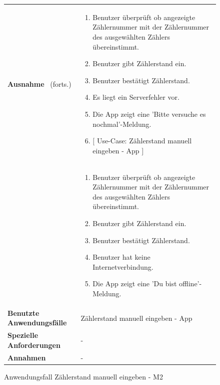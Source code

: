 \begin{figure}[H]
	\centering
	\begin{tabularx}{\textwidth}{ X | X }
	\hline
	\textbf{Ausnahme} \ (forts.)&
		\begin{enumerate}
			\item Benutzer überprüft ob angezeigte Zählernummer mit der Zählernummer des ausgewählten Zählers übereinstimmt.
			\item Benutzer gibt Zählerstand ein.
			\item Benutzer bestätigt Zählerstand.
			\item Es liegt ein Serverfehler vor.
			\item Die App zeigt eine 'Bitte versuche es nochmal'-Meldung. 
			\item $\lbrack$ Use-Case: Zählerstand manuell eingeben - App $\rbrack$
		\end{enumerate} \\  &
		\begin{enumerate}
			\item Benutzer überprüft ob angezeigte Zählernummer mit der Zählernummer des ausgewählten Zählers übereinstimmt.
			\item Benutzer gibt Zählerstand ein.
			\item Benutzer bestätigt Zählerstand.
			\item Benutzer hat keine Internetverbindung.
			\item Die App zeigt eine 'Du bist offline'-Meldung.
		\end{enumerate}  \\ \hline
		\textbf{Benutzte Anwendungsfälle} & Zählerstand manuell eingeben - App \\ \hline
		\textbf{Spezielle Anforderungen} & - \\ \hline
		\textbf{Annahmen} & -
	\end{tabularx}
	\caption{Anwendungsfall Zählerstand manuell eingeben - M2}
	\label{fig:anwendungsfall-server-tabelle-xx-1}
\end{figure}

\newpage


